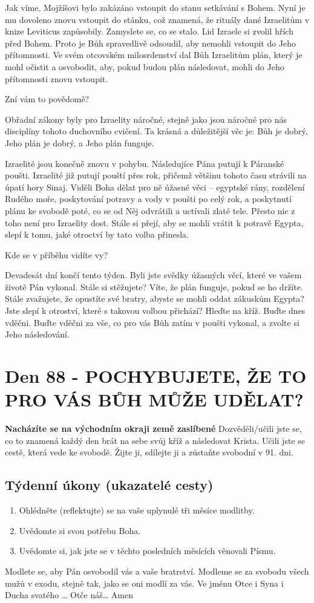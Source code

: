 \documentclass[11pt]{article}
\newcommand{\zacatekTrinactyTyden}{
\textbf{Nacházíte se na východním okraji země zaslíbené} \newline 
Dozvěděli/učili jste se, co to znamená každý den brát na sebe svůj kříž a následovat Krista. Učili jste se cestě, která vede ke svobodě. Žijte ji, sdílejte ji a zůstaňte svobodní v 91. dni.

\subsection*{Týdenní úkony (ukazatelé cesty)}
\begin{enumerate}
  \item Ohlédněte (reflektujte) se na vaše uplynulé tři měsíce modlitby.
  \item Uvědomte si svou potřebu Boha.
  \item Uvědomte si, jak jste se v těchto posledních měsících věnovali Písmu.
\end{enumerate}
Modlete se, aby Pán osvobodil vás a vaše bratrství. \newline
Modleme se za svobodu všech mužů v exodu, stejně tak, jako se oni modlí za vás.\newline
Ve jménu Otce i Syna i Ducha svatého …  Otče náš… Amen
}
\begin{document}
Jak víme, Mojžíšovi bylo zakázáno vstoupit do stanu setkávání s Bohem. Nyní je mu dovoleno znovu
vstoupit do stánku, což znamená, že rituály dané Izraelitům v knize Leviticus zapůsobily. Zamyslete se, co se
stalo. Lid Izraele si zvolil hřích před Bohem. Proto je Bůh spravedlivě odsoudil, aby nemohli vstoupit do
Jeho přítomnosti. Ve svém otcovském milosrdenství dal Bůh Izraelitům plán, který je mohl očistit a
osvobodit, aby, pokud budou plán následovat, mohli do Jeho přítomnosti znovu vstoupit.

Zní vám to povědomě?

Obřadní zákony byly pro Izraelity náročné, stejně jako jsou náročné pro nás disciplíny tohoto duchovního
cvičení. Ta krásná a důležitější věc je: Bůh je dobrý, Jeho plán je dobrý, a Jeho plán funguje.

Izraelité jsou konečně znovu v pohybu. Následujíce Pána putují k Páranské poušti. Izraelité již putují pouští
přes rok, přičemž většinu tohoto času strávili na úpatí hory Sinaj. Viděli Boha dělat pro ně úžasné věci –
egyptské rány, rozdělení Rudého moře, poskytování potravy a vody v poušti po celý rok, a poskytnutí plánu
ke svobodě poté, co se od Něj odvrátili a uctívali zlaté tele. Přesto nic z toho není pro Izraelity dost. Stále si
přejí, aby se mohli vrátit k potravě Egypta, slepí k tomu, jaké otroctví by tato volba přinesla.

Kde se v příběhu vidíte vy?

Devadesát dní končí tento týden. Byli jste svědky úžasných věcí, které ve vašem životě Pán vykonal. Stále si
stěžujete? Víte, že plán funguje, pokud se ho držíte. Stále zvažujete, že opustíte své bratry, abyste se mohli
oddat zákuskům Egypta? Jste slepí k otroství, které s takovou volbou přichází? Hleďte na kříž. Buďte dnes
vděčni. Buďte vděčni za vše, co pro vás Bůh zatím v poušti vykonal, a zvolte si Jeho následování.


\newpage
\section{Den 88 - POCHYBUJETE, ŽE TO PRO VÁS BŮH MŮŽE UDĚLAT?}
\zacatekTrinactyTyden
\end{document}
